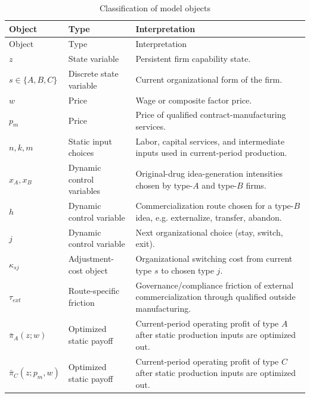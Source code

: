 \documentclass[12pt]{ctexart}
\begin{document}
\begin{longtable}{p{}p{}p{}}
\caption{Classification of model objects}\label{tab:objects}\\
\toprule
Object & Type & Interpretation \\
\midrule
\endfirsthead
\toprule
Object & Type & Interpretation \\
\midrule
\endhead

$z$ & State variable & Persistent firm capability state. \\[0.4em]

$s\in\{A,B,C\}$ & Discrete state variable & Current organizational form of the firm. \\[0.4em]

$w$ & Price & Wage or composite factor price. \\[0.4em]

$p_m$ & Price & Price of qualified contract-manufacturing services. \\[0.4em]

$n,k,m$ & Static input choices & Labor, capital services, and intermediate inputs used in current-period production. \\[0.4em]

$x_A,x_B$ & Dynamic control variables & Original-drug idea-generation intensities chosen by type-$A$ and type-$B$ firms. \\[0.4em]

$h$ & Dynamic control variable & Commercialization route chosen for a type-$B$ idea, e.g. externalize, transfer, abandon. \\[0.4em]

$j$ & Dynamic control variable & Next organizational choice (stay, switch, exit). \\[0.4em]

$\kappa_{sj}$ & Adjustment-cost object & Organizational switching cost from current type $s$ to chosen type $j$. \\[0.4em]

$\tau_{ext}$ & Route-specific friction & Governance/compliance friction of external commercialization through qualified outside manufacturing. \\[0.4em]

$\bar{\pi}_A(z;w)$ & Optimized static payoff & Current-period operating profit of type $A$ after static production inputs are optimized out. \\[0.4em]

$\bar{\pi}_C(z;p_m,w)$ & Optimized static payoff & Current-period operating profit of type $C$ after static production inputs are optimized out. \\[0.4em]


\end{longtable}
\end{document}
